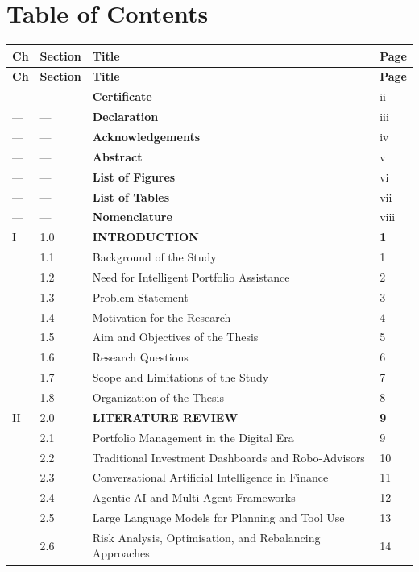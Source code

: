 \documentclass[11pt]{article}
\begin{document}
\section*{Table of Contents}
\small
\begin{longtable}{C{0.8cm}C{1.2cm}L{9.7cm}C{1.2cm}}
\toprule
\textbf{Ch} & \textbf{Section} & \textbf{Title} & \textbf{Page} \\
\midrule
\endfirsthead
\toprule
\textbf{Ch} & \textbf{Section} & \textbf{Title} & \textbf{Page} \\
\midrule
\endhead
--- & --- & \textbf{Certificate} & ii \\
--- & --- & \textbf{Declaration} & iii \\
--- & --- & \textbf{Acknowledgements} & iv \\
--- & --- & \textbf{Abstract} & v \\
--- & --- & \textbf{List of Figures} & vi \\
--- & --- & \textbf{List of Tables} & vii \\
--- & --- & \textbf{Nomenclature} & viii \\
I & 1.0 & \textbf{INTRODUCTION} & \textbf{1} \\
 & 1.1 & Background of the Study & 1 \\
 & 1.2 & Need for Intelligent Portfolio Assistance & 2 \\
 & 1.3 & Problem Statement & 3 \\
 & 1.4 & Motivation for the Research & 4 \\
 & 1.5 & Aim and Objectives of the Thesis & 5 \\
 & 1.6 & Research Questions & 6 \\
 & 1.7 & Scope and Limitations of the Study & 7 \\
 & 1.8 & Organization of the Thesis & 8 \\
II & 2.0 & \textbf{LITERATURE REVIEW} & \textbf{9} \\
 & 2.1 & Portfolio Management in the Digital Era & 9 \\
 & 2.2 & Traditional Investment Dashboards and Robo-Advisors & 10 \\
 & 2.3 & Conversational Artificial Intelligence in Finance & 11 \\
 & 2.4 & Agentic AI and Multi-Agent Frameworks & 12 \\
 & 2.5 & Large Language Models for Planning and Tool Use & 13 \\
 & 2.6 & Risk Analysis, Optimisation, and Rebalancing Approaches & 14 \\

\end{longtable}
\end{document}
